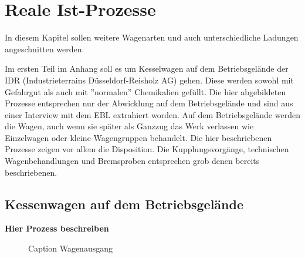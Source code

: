\section{Reale Ist-Prozesse}\label{sec:realeIst}
In diesem Kapitel sollen weitere Wagenarten und auch unterschiedliche Ladungen angeschnitten werden.\par
Im ersten Teil im Anhang soll es um Kesselwagen auf dem Betriebsgelände der IDR (Industrieterrains Düsseldorf-Reisholz AG) gehen. Diese werden sowohl mit Gefahrgut als auch mit ''normalen'' Chemikalien gefüllt. Die hier abgebildeten Prozesse entsprechen nur der Abwicklung auf dem Betriebsgelände und sind aus einer Interview mit dem EBL extrahiert worden. Auf dem Betriebsgelände werden die Wagen, auch wenn sie später als Ganzzug das Werk verlassen wie Einzelwagen oder kleine Wagengruppen behandelt. Die hier beschriebenen Prozesse zeigen vor allem die Disposition. Die Kupplungsvorgänge, technischen Wagenbehandlungen und Bremsproben entsprechen grob denen bereits beschriebenen.
\subsection{Kessenwagen auf dem Betriebsgelände}
\textbf{Hier Prozess beschreiben}
\begin{figure}
    \centering
    
    \caption{Caption Wagenausgang}
    \label{fig:IDR_Warenausgang}
\end{figure}
